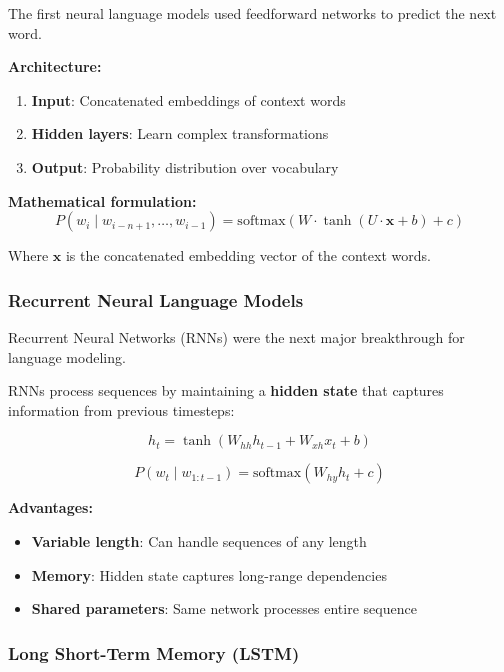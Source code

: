 \documentclass[11pt,a4paper]{article}
\theoremstyle{definition}
\theoremstyle{plain}
\theoremstyle{remark}
\begin{document}
The first neural language models used feedforward networks to predict the next word.

\textbf{Architecture:}
\begin{enumerate}
    \item \textbf{Input}: Concatenated embeddings of context words
    \item \textbf{Hidden layers}: Learn complex transformations
    \item \textbf{Output}: Probability distribution over vocabulary
\end{enumerate}

\textbf{Mathematical formulation:}
\[
P(w_i \mid w_{i-n+1}, \ldots, w_{i-1}) = \text{softmax}(W \cdot \tanh(U \cdot \mathbf{x} + b) + c)
\]

Where $\mathbf{x}$ is the concatenated embedding vector of the context words.

\subsubsection{Recurrent Neural Language Models}

Recurrent Neural Networks (RNNs) were the next major breakthrough for language modeling.

\begin{tcolorbox}[colback=green!5!white,colframe=green!75!black,title=\textbf{RNN Language Models}]
RNNs process sequences by maintaining a \textbf{hidden state} that captures information from previous timesteps:

\[
h_t = \tanh(W_{hh} h_{t-1} + W_{xh} x_t + b)
\]

\[
P(w_t \mid w_{1:t-1}) = \text{softmax}(W_{hy} h_t + c)
\]
\end{tcolorbox}

\textbf{Advantages:}
\begin{itemize}
    \item \textbf{Variable length}: Can handle sequences of any length
    \item \textbf{Memory}: Hidden state captures long-range dependencies
    \item \textbf{Shared parameters}: Same network processes entire sequence
\end{itemize}

\subsubsection{Long Short-Term Memory (LSTM)}
\end{document}
